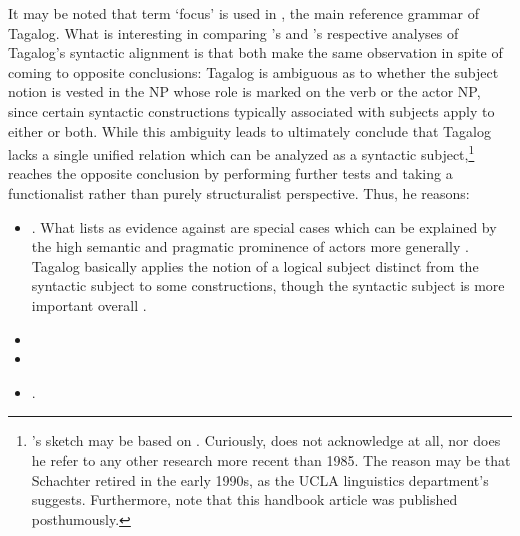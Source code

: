 It may be noted that term `focus' is used in \citet{schachterotanes1972}, the
main reference grammar of Tagalog. What is interesting in comparing
\citet{schachter2015}'s and \citet{kroeger1991}'s respective analyses of
Tagalog's syntactic alignment is that both make the same observation in spite
of coming to opposite conclusions: Tagalog is ambiguous as to whether the
subject notion is vested in the NP whose role is marked on the verb or the
actor NP, since certain syntactic constructions typically associated with
subjects apply to either or both. While this ambiguity leads
\textcites{schachter1976}{schachter2015} to ultimately conclude that Tagalog
lacks a single unified relation which can be analyzed as a syntactic
subject,\footnote{\citet{cowan1995}'s sketch may be based on
\citet{schachter1976}. Curiously, \citet{schachter2015} does not acknowledge
\citet{kroeger1991} at all, nor does he refer to any other research more recent
than 1985. The reason may be that Schachter retired in the early 1990s, as the
UCLA linguistics department's \citet{uclalingdepthist} suggests. Furthermore,
note that this handbook article was published posthumously.}
\citet{kroeger1991} reaches the opposite conclusion by performing further tests
and taking a functionalist rather than purely structuralist perspective. Thus,
he reasons:

\begin{itemize}
	\item {}. What \citet{schachter1976} lists as evidence against are
		special cases which can be explained by the high semantic and pragmatic
		prominence of actors more generally \citep[225]{kroeger1991}. Tagalog
		basically applies the notion of a logical subject distinct from the
		syntactic subject to some constructions, though the syntactic subject
		is more important overall \citep[36]{kroeger1991}.
	\item {}
	\item {}
	\item {}.
\end{itemize}

